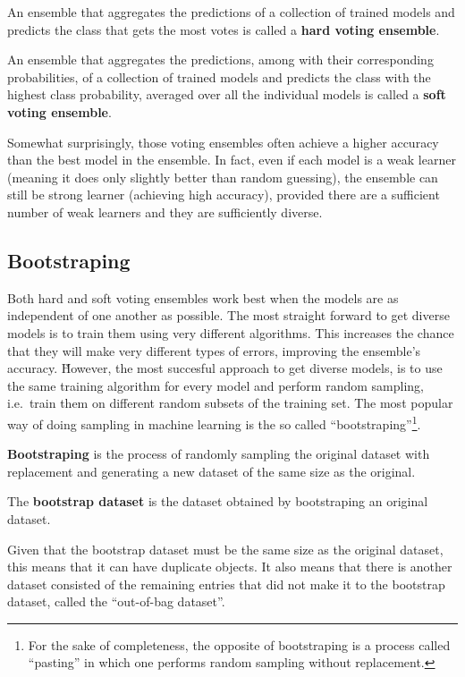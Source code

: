 An ensemble that aggregates the predictions of a collection of trained models and predicts the class that gets the most
votes is called a \textbf{hard voting ensemble}.
\ed

An ensemble that aggregates the predictions, among with their corresponding probabilities, of a collection of trained
models and predicts the class with the highest class probability, averaged over all the individual models is called a
\textbf{soft voting ensemble}.
\ed


Somewhat surprisingly, those voting ensembles often achieve a higher accuracy than the best model in the ensemble.
In fact, even if each model is a weak learner (meaning it does only slightly better than random guessing), the
ensemble can still be strong learner (achieving high accuracy), provided there are a sufficient number of weak
learners and they are sufficiently diverse.

\subsection{Bootstraping}

Both hard and soft voting ensembles work best when the models are as independent of one another as possible. The
most straight forward to get diverse models is to train them using very different algorithms. This increases the
chance that they will make very different types of errors, improving the ensemble's accuracy. \v

However, the most succesful approach to get diverse models, is to use the same training algorithm for every model
and perform random sampling, i.e.\ train them on different random subsets of the training set. The most popular way
of doing sampling in machine learning is the so called ``bootstraping''\footnote{For the sake of completeness, the
opposite of bootstraping is a process called ``pasting'' in which one performs random sampling without replacement.}.

\bd[Bootstraping]
\textbf{Bootstraping} is the process of randomly sampling the original dataset with replacement and generating a new
dataset of the same size as the original.
\ed

The \textbf{bootstrap dataset} is the dataset obtained by bootstraping an original dataset.
\ed

Given that the bootstrap dataset must be the same size as the original dataset, this means that it can have
duplicate objects. It also means that there is another dataset consisted of the remaining entries that did not
make it to the bootstrap dataset, called the ``out-of-bag dataset''.

